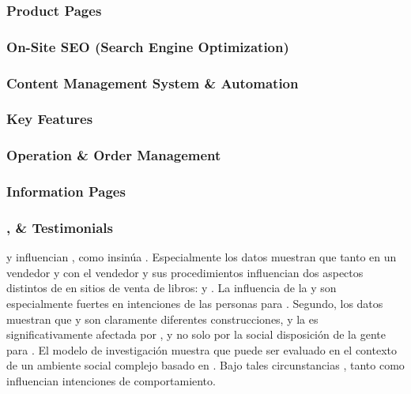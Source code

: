 \subsubsection{Product Pages}

\subsubsection{On-Site SEO (Search Engine Optimization)}

\subsubsection{Content Management System \& Automation}

\subsubsection{Key \ecommerce Features}

\subsubsection{Operation \& Order Management}

\subsubsection{Information Pages}

\subsubsection{\security, \trust \& Testimonials}

\trust y \familiarity influencian \ecommerce, como insinúa \luhmanntheory. Especialmente los datos muestran que tanto \trust en un vendedor \internet y \familiarity con el vendedor y sus procedimientos influencian dos aspectos distintos de \ecommerce en sitios de venta de libros: \inquiry y \purchase. La influencia de la  \familiarity y \trust son especialmente fuertes en intenciones  de las personas para \purchase. Segundo, los datos muestran que \trust y \familiarity son claramente diferentes construcciones, y la \trust es significativamente afectada por \familiarity, y no solo por la social disposición de la gente para \trust. El modelo de investigación muestra que  \ecommerce puede ser evaluado en el contexto de un ambiente social complejo basado en \luhmanntheory. Bajo tales circunstancias , tanto \trust como \familiarity influencian intenciones de comportamiento\cite{gefen2000commerce}.


